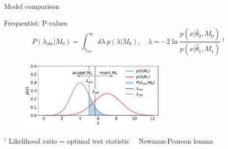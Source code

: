 \documentclass[
aspectratio=169,
14pt,
professionalfonts
]{beamer}
\newcommand{\arrow}{~\ding{220}~}
\begin{document}
\begin{frame}
    \center
    \Large
    Model comparison
\end{frame}

\begin{frame}{Frequentist: P-values}
    \vspace{-1cm}
    $$
    P(\lambda_{obs}|M_0) = \int_{\lambda_{obs}}^\infty d\lambda ~ p(\lambda|M_0), \quad  \lambda = -2 \ln \frac{p(x|\hat \theta_0, M_0)}{p(x|\hat \theta_1, M_1)} ~^\dagger
    $$
    \begin{figure}
        \centering
        \includegraphics[width=0.65\textwidth]{../plots/hypo.pdf}
    \end{figure}
    \small
    $^\dagger$ Likelihood ratio = optimal test statistic \arrow Newman-Pearson lemma
\end{frame}
\end{document}
